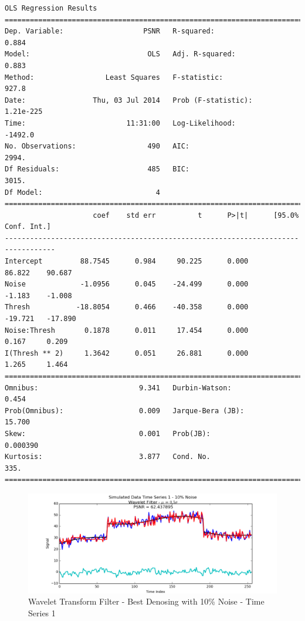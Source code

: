 \documentclass[11pt]{article}
\theoremstyle{definition}
\begin{document}
{\begin{lstlisting}[caption = Time Series 3 - Wavelet Coefficient Thresholding OLS Model, label = {waveletfilterseries3}]
                            OLS Regression Results                            
==============================================================================
Dep. Variable:                   PSNR   R-squared:                       0.884
Model:                            OLS   Adj. R-squared:                  0.883
Method:                 Least Squares   F-statistic:                     927.8
Date:                Thu, 03 Jul 2014   Prob (F-statistic):          1.21e-225
Time:                        11:31:00   Log-Likelihood:                -1492.0
No. Observations:                 490   AIC:                             2994.
Df Residuals:                     485   BIC:                             3015.
Df Model:                           4                                         
==================================================================================
                     coef    std err          t      P>|t|      [95.0% Conf. Int.]
----------------------------------------------------------------------------------
Intercept         88.7545      0.984     90.225      0.000        86.822    90.687
Noise             -1.0956      0.045    -24.499      0.000        -1.183    -1.008
Thresh           -18.8054      0.466    -40.358      0.000       -19.721   -17.890
Noise:Thresh       0.1878      0.011     17.454      0.000         0.167     0.209
I(Thresh ** 2)     1.3642      0.051     26.881      0.000         1.265     1.464
==============================================================================
Omnibus:                        9.341   Durbin-Watson:                   0.454
Prob(Omnibus):                  0.009   Jarque-Bera (JB):               15.700
Skew:                           0.001   Prob(JB):                     0.000390
Kurtosis:                       3.877   Cond. No.                         335.
==============================================================================
\end{lstlisting}
}

\begin{figure}
\centering
\includegraphics[width = 0.75 \textwidth]{WaveletSignal1Best.png}
\caption{Wavelet Transform Filter - Best Denosing with 10\% Noise - Time Series 1}
\label{wavelet1best}
\end{figure}
\end{document}
